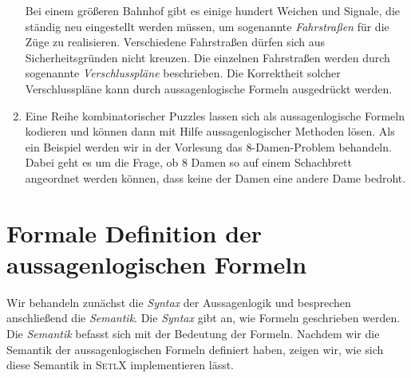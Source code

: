 \begin{enumerate}
      Bei einem gr\"{o}\ss{}eren Bahnhof gibt es einige hundert Weichen und Signale, die st\"{a}ndig
      neu eingestellt werden m\"{u}ssen, um sogenannte \emph{Fahrstra\ss{}en} f\"{u}r die Z\"{u}ge zu
      realisieren.  Verschiedene Fahrstra\ss{}en d\"{u}rfen sich aus Sicherheitsgr\"{u}nden nicht kreuzen.  
      Die einzelnen Fahrstra\ss{}en werden durch sogenannte \emph{Verschlusspl\"{a}ne} beschrieben.
      Die Korrektheit solcher Verschlusspl\"{a}ne kann durch aussagenlogische Formeln ausgedr\"{u}ckt werden.
\item Eine Reihe kombinatorischer Puzzles lassen sich als aussagenlogische Formeln
      kodieren und k\"{o}nnen dann mit Hilfe aussagenlogischer Methoden l\"{o}sen.  Als ein
      Beispiel werden wir in der Vorlesung das 8-Damen-Problem behandeln.  Dabei geht es um die Frage,
      ob 8 Damen so auf einem Schachbrett angeordnet werden k\"{o}nnen, dass keine der Damen
      eine andere Dame bedroht.
\end{enumerate}

\section{Formale Definition der aussagenlogischen Formeln}
Wir behandeln zun\"{a}chst die \emph{Syntax} der Aussagenlogik und besprechen anschlie\ss{}end die
\emph{Semantik}.  Die \textsl{Syntax} gibt an, wie Formeln geschrieben werden.
Die \emph{Semantik} befasst sich mit der Bedeutung der Formeln.
Nachdem wir die Semantik der aussagenlogischen Formeln definiert haben, zeigen wir,
wie sich diese Semantik in \textsc{SetlX} implementieren l\"{a}sst.

